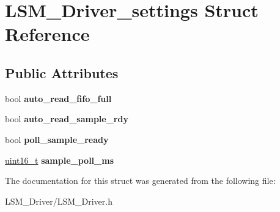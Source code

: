 \hypertarget{structLSM__Driver__settings}{}\section{L\+S\+M\+\_\+\+Driver\+\_\+settings Struct Reference}
\label{structLSM__Driver__settings}
\subsection*{Public Attributes}
\begin{DoxyCompactItemize}
\item 
\mbox{\label{structLSM__Driver__settings_a2660432eceddfb51dd84845092fb5cf3}} 
bool {\bfseries auto\+\_\+read\+\_\+fifo\+\_\+full}
\item 
\mbox{\label{structLSM__Driver__settings_aa6a9de82faf20e36929c683c85772b54}} 
bool {\bfseries auto\+\_\+read\+\_\+sample\+\_\+rdy}
\item 
\mbox{\label{structLSM__Driver__settings_afa2d22be287b87b0e04c5e793616e6e2}} 
bool {\bfseries poll\+\_\+sample\+\_\+ready}
\item 
\mbox{\label{structLSM__Driver__settings_ae4efa962818a2507a11947178837b6f2}} 
\hyperlink{vl53l0x__types_8h_a273cf69d639a59973b6019625df33e30}{uint16\+\_\+t} {\bfseries sample\+\_\+poll\+\_\+ms}
\end{DoxyCompactItemize}


The documentation for this struct was generated from the following file\+:\begin{DoxyCompactItemize}
\item 
L\+S\+M\+\_\+\+Driver/L\+S\+M\+\_\+\+Driver.\+h\end{DoxyCompactItemize}
